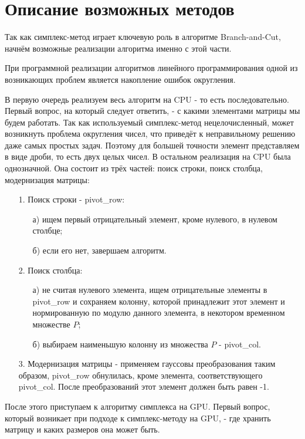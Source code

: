\documentclass[a4paper,14pt,russian]{extreport}
\begin{document}
\section{Описание возможных методов}
Так как симплекс-метод играет ключевую роль в алгоритме Branch-and-Cut, начнём возможные реализации алгоритма именно с этой части.  
\par
При программной реализации алгоритмов линейного программирования одной из возникающих проблем является накопление ошибок округления. 
\par
В первую очередь реализуем весь алгоритм на CPU - то есть последовательно. Первый вопрос, на который следует ответить, - с какими элементами матрицы мы будем работать. Так как используемый симплекс-метод нецелочисленный, может возникнуть проблема округления чисел, что приведёт к неправильному решению даже самых простых задач. Поэтому для большей точности элемент представляем в виде дроби, то есть двух целых чисел. В остальном реализация на CPU была однозначной. Она состоит из трёх частей: поиск строки, поиск столбца, модернизация матрицы:
\begin{enumerate}
\item[1.] Поиск строки - pivot\_row:
  \begin{enumerate}
  \item[а)] ищем первый отрицательный элемент, кроме нулевого, в нулевом столбце;
  \item[б)] если его нет, завершаем алгоритм.
  \end{enumerate}
\item[2.] Поиск столбца:
  \begin{enumerate}
  \item[а)] не считая нулевого элемента, ищем отрицательные элементы в pivot\_row и сохраняем колонну, которой принадлежит этот элемент и нормированную по модулю данного элемента, в некотором временном множестве $P$;
  \item[б)] выбираем наименьшую колонну из множества $P$ - pivot\_col.
  \end{enumerate}
\item[3.] Модернизация матрицы - применяем гауссовы преобразования таким образом, pivot\_row обнулилась, кроме элемента, соответствующего pivot\_col. После преобразований этот элемент должен быть равен -1.
\end{enumerate}
\par
После этого приступаем к алгоритму симплекса на GPU. Первый вопрос, который возникает при подходе к симплекс-методу на GPU, - где хранить матрицу и каких размеров она может быть. 
\end{document}
